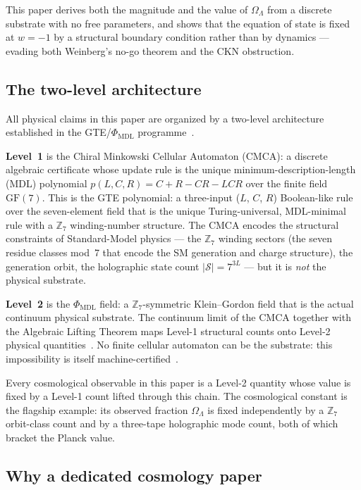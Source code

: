\documentclass[11pt]{article}
\theoremstyle{remark}
\newcommand{\PHIMDL}{\Phi_{\mathrm{MDL}}}
\newcommand{\ZS}{\mathbb{Z}_7}
\newcommand{\OmL}{\Omega_\Lambda}
\newcommand{\CMCA}{\text{CMCA}}
\newcommand{\poly}{p(L,C,R)}
\begin{document}
This paper derives both the magnitude and the value of $\OmL$ from a discrete
substrate with no free parameters, and shows that the equation of state is fixed at
$w = -1$ by a structural boundary condition rather than by dynamics --- evading
both Weinberg's no-go theorem and the CKN obstruction.

\subsection{The two-level architecture}

All physical claims in this paper are organized by a two-level architecture
established in the GTE/$\PHIMDL$ programme~\cite{SpivackCMCA,SpivackPhiMDLField,%
SpivackCompleteness}.

\textbf{Level~1} is the Chiral Minkowski Cellular Automaton ($\CMCA$): a discrete
algebraic certificate whose update rule is the unique minimum-description-length
(MDL) polynomial $\poly = C + R - CR - LCR$ over the finite field $\mathrm{GF}(7)$.
This is the GTE polynomial: a three-input ($L$, $C$, $R$) Boolean-like rule
over the seven-element field that is the unique Turing-universal, MDL-minimal
rule with a $\mathbb{Z}_7$ winding-number structure.
The $\CMCA$ encodes the structural constraints of Standard-Model physics --- the
$\ZS$ winding sectors (the seven residue classes mod~7 that encode the SM
generation and charge structure), the generation orbit, the holographic state count
$|\mathcal{S}| = 7^{3L}$ --- but it is \emph{not} the physical substrate.

\textbf{Level~2} is the $\PHIMDL$ field: a $\ZS$-symmetric Klein--Gordon field that
is the actual continuum physical substrate. The continuum limit of the $\CMCA$
together with the Algebraic Lifting Theorem maps Level-1 structural counts onto
Level-2 physical quantities~\cite{SpivackPhiMDLField,SpivackCompleteness}. No
finite cellular automaton can be the substrate: this impossibility is itself
machine-certified~\cite{SpivackCompleteness}.

Every cosmological observable in this paper is a Level-2 quantity whose value is
fixed by a Level-1 count lifted through this chain. The cosmological constant is
the flagship example: its observed fraction $\OmL$ is fixed independently by a
$\ZS$ orbit-class count and by a three-tape holographic mode count, both of which
bracket the Planck value.

\subsection{Why a dedicated cosmology paper}
\end{document}
